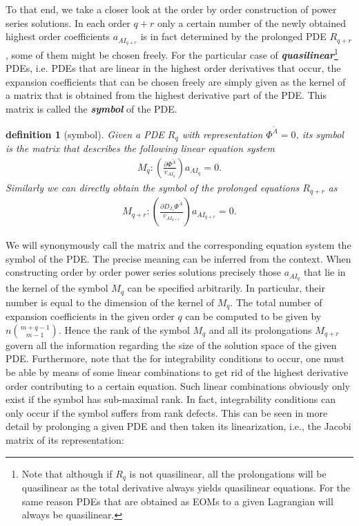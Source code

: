 \documentclass[a4paper,12pt, DIV=14, BCOR=5mm, twoside, headsepline, numbers=noenddot]{scrbook}
\newtheorem{definition}{definition}[section]
\begin{document}
To that end, we take a closer look at the order by order construction of power series solutions.
In each order $q+r$ only a certain number of the newly obtained highest order coefficients $a_{AI_{q+r}}$ is in fact determined by the prolonged PDE $R_{q+r}$, some of them might be chosen freely.
For the particular case of \textit{\textbf{quasilinear}}\footnote{Note that although if $R_q$ is not quasilinear, all the prolongations will be quasilinear as the total derivative always yields quasilinear equations. For the same reason PDEs that are obtained as EOMs to a given Lagrangian will always be quasilinear.} PDEs, i.e. PDEs that are linear in the highest order derivatives that occur, the expansion coefficients that can be chosen freely are simply given as the kernel of a matrix that is obtained from the highest derivative part of the PDE. This matrix is called the \textit{\textbf{symbol}} of the PDE.
\begin{definition}[symbol]
Given a PDE $R_q$ with representation $\Phi^{\tilde{A}}=0$, its symbol is the matrix that describes the following linear equation system 
\begin{align}
    M_q : \left ( \frac{\partial \Phi^{\tilde{A}}}{v_{AI_q}} \right ) a_{AI_q} = 0.
\end{align}
Similarly we can directly obtain the symbol of the prolonged equations $R_{q+r}$ as  
\begin{align}
    M_{q+r} : \left ( \frac{\partial D_{J_r}\Phi^{\tilde{A}
    }}{v_{AI_{q+r}}} \right ) a_{AI_{q+r}} = 0. 
\end{align}
\end{definition}
We will synonymously call the matrix and the corresponding equation system the symbol of the PDE. The precise meaning can be inferred from the context. When constructing order by order power series solutions precisely those $a_{AI_q}$ that lie in the kernel of the symbol $M_q$ can be specified arbitrarily. In particular, their number is equal to the dimension of the kernel of $M_q$. The total number of expansion coefficients in the given order $q$ can be computed to be given by $n\binom{m+q-1}{m-1}$.
Hence the rank of the symbol $M_q$ and all its prolongations $M_{q+r}$ govern all the information regarding the size of the solution space of the given PDE. Furthermore, note that the for integrability conditions to occur, one must be able by means of some linear combinations to get rid of the highest derivative order contributing to a certain equation. Such linear combinations obviously only exist if the symbol has sub-maximal rank.  In fact, integrability conditions can only occur if the symbol suffers from rank defects. This can be seen in more detail by prolonging a given PDE and then taken its linearization, i.e., the Jacobi matrix of its representation:
\end{document}
